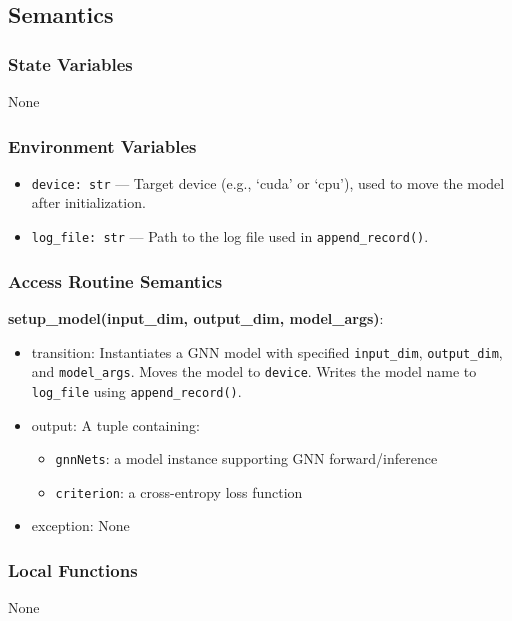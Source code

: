 \documentclass[12pt, titlepage]{article}
\begin{document}
\subsection{Semantics}

\subsubsection{State Variables}
None

\subsubsection{Environment Variables}
\begin{itemize}
  \item \texttt{device: str} — Target device (e.g., `cuda' or `cpu'), used to move the model after initialization.
  \item \texttt{log\_file: str} — Path to the log file used in \texttt{append\_record()}.
\end{itemize}

\subsubsection{Access Routine Semantics}

\noindent \textbf{setup\_model(input\_dim, output\_dim, model\_args)}:
\begin{itemize}
  \item transition: Instantiates a GNN model with specified \texttt{input\_dim}, \texttt{output\_dim}, and \texttt{model\_args}. Moves the model to \texttt{device}. Writes the model name to \texttt{log\_file} using \texttt{append\_record()}.
  \item output: A tuple containing:
  \begin{itemize}
    \item \texttt{gnnNets}: a model instance supporting GNN forward/inference
    \item \texttt{criterion}: a cross-entropy loss function
  \end{itemize}
  \item exception: None
\end{itemize}

\subsubsection{Local Functions}
None
\end{document}
